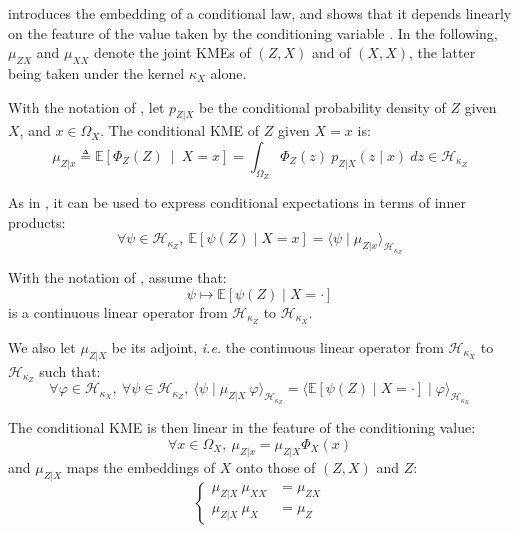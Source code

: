  introduces the embedding of a conditional law, and  shows that it depends linearly on the feature of the value taken by the conditioning variable \cite{bib:conditional-embeddings}. In the following, $\mu_{ZX}$ and $\mu_{XX}$ denote the joint KMEs of $(Z,X)$ and of $(X,X)$, the latter being taken under the kernel $\kappa_X$ alone.

\begin{definition}\label{th:conditional_KME}
	With the notation of , let $p_{Z|X}$ be the conditional probability density of $Z$ given $X$, and $x\in\Omega_X$. The conditional KME of $Z$ given $X=x$ is:
	\begin{equation}
		\mu_{Z|x}\triangleq\mathbb{E}\left[\Phi_Z(Z)\:\middle|\:X=x\right]=\int_{\Omega_Z}{\Phi_Z(z)\:p_{Z|X}(z\mid x)\:dz}\in\mathcal{H}_{\kappa_Z}\label{eq:conditional_KME}
	\end{equation}

	As in , it can be used to express conditional expectations in terms of inner products:
	\begin{equation}
		\forall\psi\in\mathcal{H}_{\kappa_Z},\:\mathbb{E}[\psi(Z)\mid X=x]=\langle\psi\mid\mu_{Z|x}\rangle_{\mathcal{H}_{\kappa_Z}}
	\end{equation}
\end{definition}

\begin{proposition}\label{th:conditional_operator}
	With the notation of , assume that:
	\begin{equation}
		\psi\mapsto\mathbb{E}[\psi(Z)\mid X=\cdot]
	\end{equation}
	is a continuous linear operator from $\mathcal{H}_{\kappa_Z}$ to $\mathcal{H}_{\kappa_X}$.

	We also let $\mu_{Z|X}$ be its adjoint, \textit{i.e.} the continuous linear operator from $\mathcal{H}_{\kappa_X}$ to $\mathcal{H}_{\kappa_Z}$ such that:
	\begin{equation}
		\forall\varphi\in\mathcal{H}_{\kappa_X},\:\forall\psi\in\mathcal{H}_{\kappa_Z},\:\langle\psi\mid\mu_{Z|X}\:\varphi\rangle_{\mathcal{H}_{\kappa_Z}}=\langle\mathbb{E}[\psi(Z)\mid X=\cdot]\mid\varphi\rangle_{\mathcal{H}_{\kappa_X}}
	\end{equation}

	The conditional KME is then linear in the feature of the conditioning value:
	\begin{equation}
		\forall x\in\Omega_X,\:\mu_{Z|x}=\mu_{Z|X}\Phi_X(x)
	\end{equation}
	and $\mu_{Z|X}$ maps the embeddings of $X$ onto those of $(Z,X)$ and $Z$:
	\begin{equation}
		\left\{\begin{aligned}
		\mu_{Z|X}\:\mu_{XX}&=\mu_{ZX}\\
		\mu_{Z|X}\:\mu_X&=\mu_Z
		\end{aligned}\right.
	\end{equation}
\end{proposition}

